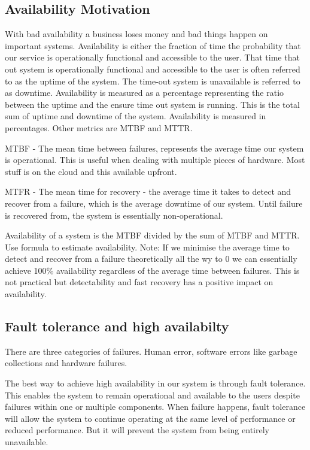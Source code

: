 \subsection{Availability Motivation}
With bad availability a business loses money and bad things happen on important systems.
Availability is either the fraction of time the probability that our service is operationally functional and accessible to the user.
That time that out system is operationally functional and accessible to the user is often referred to as the uptime of the system.
The time-out system is unavailable is referred to as downtime.
Availability is measured as a percentage representing the ratio between the uptime and the ensure time out system is running.
This is the total sum of uptime and downtime of the system.
Availability is measured in percentages.
Other metrics are MTBF and MTTR.

MTBF - The mean time between failures, represents the average time our system is operational.
This is useful when dealing with multiple pieces of hardware.
Most stuff is on the cloud and this available upfront.

MTFR - The mean time for recovery - the average time it takes to detect and recover from a failure, which is the average downtime of our system.
Until failure is recovered from, the system is essentially non-operational.

Availability of a system is the MTBF divided by the sum of MTBF and MTTR.
Use formula to estimate availability.
Note: If we minimise the average time to detect and recover from a failure theoretically all the wy to 0 we can essentially achieve 100\%
availability regardless of the average time between failures.
This is not practical but detectability and fast recovery has a positive impact on availability.

\subsection{Fault tolerance and high availabilty}
There are three categories of failures.
Human error, software errors like garbage collections and hardware failures.

The best way to achieve high availability in our system is through fault tolerance.
This enables the system to remain operational and available to the users despite failures within one or multiple components.
When failure happens, fault tolerance will allow the system to continue operating at the same level of performance or reduced performance.
But it will prevent the system from being entirely unavailable.

